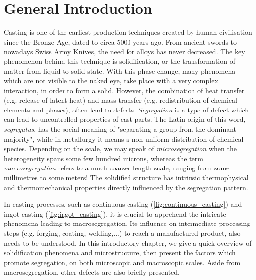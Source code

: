 \chapter{General Introduction}
Casting is one of the earliest production techniques created by human civilisation since the Bronze Age, dated to circa 5000 years ago. 
From ancient swords to nowadays Swiss Army Knives, the need for alloys has never decreased.
The key phenomenon behind this technique is solidification, or the transformation of matter from liquid to solid state. With this phase change, 
many phenomena which are not visible to the naked eye, take place with a very complex interaction, in order to form a solid. 
However, the combination of heat transfer (e.g. release of latent heat) and mass transfer (e.g. redistribution of chemical
elements and phases), often lead to defects. \emph{Segregation} is a type of defect which can lead to uncontrolled properties of cast parts. 
The Latin origin of this word, \emph{segregatus}, has the social meaning of "separating a group from the dominant majority", while 
in metallurgy it means a non uniform distribution of chemical species. Depending on the scale, we may speak of \emph{microsegregation}
when the heterogeneity spans some few hundred microns, whereas the term \emph{macrosegregation} refers to a much coarser length scale, ranging
from some millimetres to some meters! The solidified structure has intrinsic thermophysical and thermomechanical properties directly influenced by the segregation pattern. 

In casting processes, such as continuous casting (\cref{fig:continuous_casting}) and ingot casting (\cref{fig:ingot_casting}), it is crucial to apprehend 
the intricate phenomena leading to macrosegregation. Its influence on intermediate processing steps (e.g. forging, coating, welding,...)
to reach a manufactured product, also needs to be understood.
In this introductory chapter, we give a quick overview of solidification phenomena and microstructure, then present the factors which
promote segregation, on both microscopic and macroscopic scales. Aside from macrosegregation, other defects are also briefly presented.

